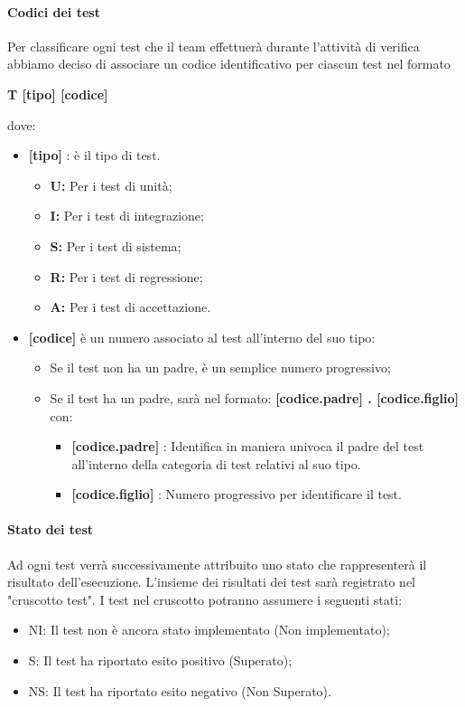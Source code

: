 \paragraph{Codici dei test}
Per classificare ogni test che il team effettuerà durante l'attività di verifica abbiamo deciso di associare un codice identificativo per ciascun test nel formato
\begin{center} \textbf{T [tipo] [codice]}
\end{center}
dove:
\begin{itemize}
    \item \textbf{[tipo]} : è il tipo di test.
          \begin{itemize}
              \item \textbf{U:} Per i test di unità;
              \item \textbf{I:} Per i test di integrazione;
              \item \textbf{S:} Per i test di sistema;
              \item \textbf{R:} Per i test di regressione;
              \item\textbf{A:} Per i test di accettazione.
          \end{itemize}
    \item \textbf{[codice]} è un numero associato al test all'interno del suo tipo:
          \begin{itemize}
              \item Se il test non ha un padre, è un semplice numero progressivo;
              \item Se il test ha un padre, sarà nel formato: \textbf{[codice.padre] . [codice.figlio]} con:
                    \begin{itemize}
                        \item \textbf{[codice.padre]} : Identifica in maniera univoca il padre del test all'interno della categoria di test relativi al suo tipo.
                        \item \textbf{[codice.figlio]} : Numero progressivo per identificare il test.
                    \end{itemize}
          \end{itemize}
\end{itemize}


\paragraph{Stato dei test}
Ad ogni test verrà successivamente attribuito uno stato che rappresenterà il risultato dell'esecuzione. L'insieme dei risultati dei test sarà registrato nel "cruscotto test". I test nel cruscotto potranno assumere i seguenti stati:
\begin{itemize}
    \item NI: Il test non è ancora stato implementato (Non implementato);
    \item S: Il test ha riportato esito positivo (Superato);
    \item NS: Il test ha riportato esito negativo (Non Superato).
\end{itemize}



